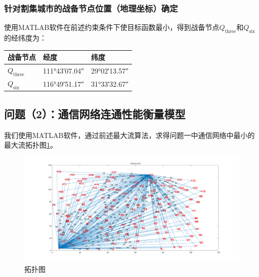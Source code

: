 \documentclass{article}
\begin{document}
\subsubsection{针对割集城市的战备节点位置（地理坐标）确定}
\label{针对割集城市的战备节点位置（地理坐标）确定}

使用MATLAB软件在前述约束条件下使目标函数最小，得到战备节点$Q_\text{three}$和$Q_\text{six}$的经纬度为：

\begin{table}[htpb]
	\centering
	\caption{对应于宜昌、沙市、岳阳、武汉、黄石、信阳、南昌、九江、安庆的战备节点的经纬度}
	\label{AB}
	\begin{longtabu}to
		\toprule
		战备节点         & 经度 & 纬度 \\
		\midrule
		$Q_\text{three}$ &  \ang{111;43;07.04}    &  \ang{29;02;13.57}    \\
		$Q_\text{six}$   &  \ang{116;49;51.17}    &  \ang{31;33;32.67}    \\
		\bottomrule
	\end{longtabu}
\end{table}

\addtocounter{subsection}{-1}

\subsection{问题（2）：通信网络连通性能衡量模型}
\label{ssub:问题\chinese{subsection}（2）：通信网络连通性能衡量模型}

我们使用MATLAB软件，通过前述最大流算法，求得问题一中通信网络中最小的最大流拓扑图\ref{fig:拓扑图}。

\begin{figure}[htpb]
	\centering
	\includegraphics[width=\linewidth]{4.png}
	\caption{拓扑图}
	\label{fig:拓扑图}
\end{figure}
\end{document}
